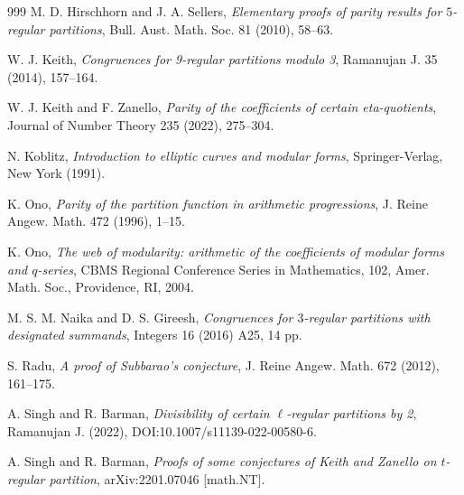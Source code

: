 \documentclass[reqno]{amsart}
\theoremstyle{definition}
\theoremstyle{remark}
\numberwithin{equation}{section}
\begin{document}
\begin{thebibliography}{999}
M. D. Hirschhorn and J. A. Sellers, {\it Elementary proofs of parity results for $5$-regular partitions}, Bull. Aust. Math. Soc. 81 (2010), 58--63.


W. J. Keith, {\it Congruences for 9-regular partitions modulo 3}, Ramanujan J. 35 (2014), 157--164.

W. J. Keith and F. Zanello, {\it Parity of the coefficients of certain eta-quotients}, Journal of Number Theory 235 (2022), 275--304.

N. Koblitz, {\it Introduction to elliptic curves and modular forms}, Springer-Verlag, New York (1991).


K. Ono, {\it Parity of the partition function in arithmetic progressions}, J. Reine Angew. Math. 472 (1996), 1--15.

K. Ono, {\it The web of modularity: arithmetic of the coefficients of modular forms and $q$-series}, CBMS Regional Conference Series in Mathematics, 102, Amer. Math. Soc., Providence, RI, 2004.

M. S. M. Naika and D. S. Gireesh, {\it Congruences for $3$-regular partitions with designated summands}, Integers 16 (2016) A25, 14 pp.

S. Radu, {\it A proof of Subbarao's conjecture}, J. Reine Angew. Math. 672 (2012), 161--175.


A. Singh and R. Barman, {\it Divisibility of certain $\ell$-regular partitions by 2}, Ramanujan J. (2022), DOI:10.1007/s11139-022-00580-6.

A. Singh and R. Barman, {\it Proofs of some conjectures of Keith and Zanello on $t$-regular partition}, 	arXiv:2201.07046 [math.NT].



\end{thebibliography}
\end{document}
